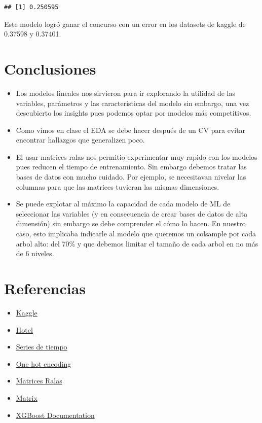 \documentclass[
]{article}
\providecommand{\tightlist}{%
  \setlength{\itemsep}{0pt}\setlength{\parskip}{0pt}}
\begin{document}
\begin{verbatim}
## [1] 0.250595
\end{verbatim}

Este modelo logró ganar el concurso con un error en los datasets de
kaggle de 0.37598 y 0.37401.

\hypertarget{conclusiones}{%
\section{Conclusiones}\label{conclusiones}}

\begin{itemize}
\item
  Los modelos lineales nos sirvieron para ir explorando la utilidad de
  las variables, parámetros y las caracteristicas del modelo sin
  embargo, una vez descubierto los insights pues podemos optar por
  modelos más competitivos.
\item
  Como vimos en clase el EDA se debe hacer después de un CV para evitar
  encontrar hallazgos que generalizen poco.
\item
  El usar matrices ralas nos permitio experimentar muy rapido con los
  modelos pues reducen el tiempo de entrenamiento. Sin embargo debemos
  tratar las bases de datos con mucho cuidado. Por ejemplo, se
  necesitavan nivelar las columnas para que las matrices tuvieran las
  mismas dimensiones.
\item
  Se puede explotar al máximo la capacidad de cada modelo de ML de
  seleccionar las variables (y en consecuencia de crear bases de datos
  de alta dimensión) sin embargo se debe comprender el cómo lo hacen. En
  nuestro caso, esto implicaba indicarle al modelo que queremos un
  colsample por cada arbol alto: del 70\% y que debemos limitar el
  tamaño de cada arbol en no más de 6 niveles.
\end{itemize}

\hypertarget{referencias}{%
\section{Referencias}\label{referencias}}

\begin{itemize}
\tightlist
\item
  \href{https://www.kaggle.com/c/cancelaciones-en-hoteles/data}{Kaggle}
\item
  \href{https://www.sciencedirect.com/science/article/pii/S2352340918315191}{Hotel}
\item
  \href{https://es.wikipedia.org/wiki/Serie_temporal}{Series de tiempo}
\item
  \href{https://www.educative.io/blog/one-hot-encoding}{One hot
  encoding}
\item
  \href{http://amunategui.github.io/sparse-matrix-glmnet/}{Matrices
  Ralas}
\item
  \href{https://cran.rproject.org/web/packages/Matrix/index.html}{Matrix}
\item
  \href{https://xgboost.readthedocs.io/en/stable/}{XGBoost
  Documentation}
\end{itemize}
\end{document}
